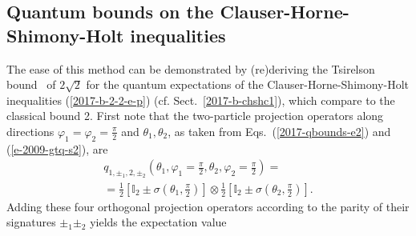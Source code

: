 \documentclass[%
  twocolumn,
 showpacs,
 showkeys,
 preprintnumbers,
 amsmath,amssymb,
 aps,
  pra,
  longbibliography,
 floatfix,
 ]{revtex4-1}
\begin{document}
\subsection{Quantum bounds on the Clauser-Horne-Shimony-Holt inequalities}

The ease of this method can be demonstrated by (re)deriving the Tsirelson bound~\cite{cirelson:80}
of $2\sqrt{2}$ for the quantum expectations of the Clauser-Horne-Shimony-Holt inequalities (\ref{2017-b-2-2-e-p})
(cf. Sect.~\ref{2017-b-chshc1}), which compare to the classical bound 2.
First note that the two-particle projection operators along directions $\varphi_1=\varphi_2=\frac{\pi}{2}$
and $\theta_1, \theta_2$, as taken  from Eqs.~(\ref{2017-qbounds-e2}) and (\ref{e-2009-gtq-s2}), are
\begin{equation}
\begin{split}
q_{1, \pm_1 ,2, \pm_2 }( \theta_1,\varphi_1  = \frac{\pi}{2} , \theta_2,\varphi_2=\frac{\pi}{2})
 =   \\ =
 {\frac{1}{2}}\left[{\mathbb I}_2 \pm {\sigma}( \theta_1,\frac{\pi}{2} )\right]
 \otimes
 {\frac{1}{2}}\left[{\mathbb I}_2 \pm {\sigma}( \theta_2,\frac{\pi}{2} )\right]
.
\end{split}
\label{e-2017-b-whatever-e1}
\end{equation}
Adding these four orthogonal projection operators according to the parity of their signatures $\pm_1  \pm_2$
yields the expectation value
\end{document}
